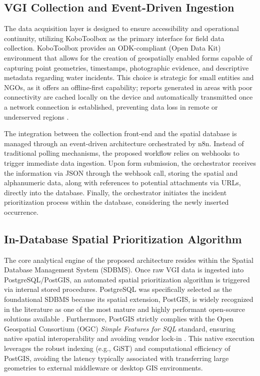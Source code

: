 \documentclass[conference]{IEEEtran}
\renewcommand\hl[1]{#1}
\begin{document}
\subsection{VGI Collection and Event-Driven Ingestion}

The data acquisition layer is designed to ensure accessibility and operational continuity, utilizing KoboToolbox as the primary interface for field data collection. KoboToolbox provides an ODK-compliant (Open Data Kit) environment that allows for the creation of geospatially enabled forms capable of capturing point geometries, timestamps, photographic evidence, and descriptive metadata regarding water incidents. This choice is strategic for small entities and NGOs, as it offers an offline-first capability; reports generated in areas with poor connectivity are cached locally on the device and automatically transmitted once a network connection is established, preventing data loss in remote or underserved regions \cite{brovelli2016, mcdonald2025}.

The integration between the collection front-end and the spatial database is managed through an event-driven architecture orchestrated by n8n. Instead of traditional polling mechanisms, the proposed workflow relies on webhooks to trigger immediate data ingestion. Upon form submission, the orchestrator receives the information via JSON through the webhook call, storing the spatial and alphanumeric data, along with references to potential attachments via URLs, directly into the database. Finally, the orchestrator initiates the incident prioritization process within the database, considering the newly inserted occurrence.

\subsection{In-Database Spatial Prioritization Algorithm}

The core analytical engine of the proposed architecture resides within the Spatial Database Management System (SDBMS). Once raw VGI data is ingested into PostgreSQL/PostGIS, an automated spatial prioritization algorithm is triggered via internal stored procedures. \hl{PostgreSQL was specifically selected as the foundational SDBMS because its spatial extension, PostGIS, is widely recognized in the literature as one of the most mature and highly performant open-source solutions available \cite{obe2021}. Furthermore, PostGIS strictly complies with the Open Geospatial Consortium (OGC) \textit{Simple Features for SQL} standard, ensuring native spatial interoperability and avoiding vendor lock-in \cite{brovelli2016}.} This native execution leverages the robust indexing \hl{(e.g., GiST)} and computational efficiency of PostGIS, avoiding the latency typically associated with transferring large geometries to external middleware or desktop GIS environments.
\end{document}
